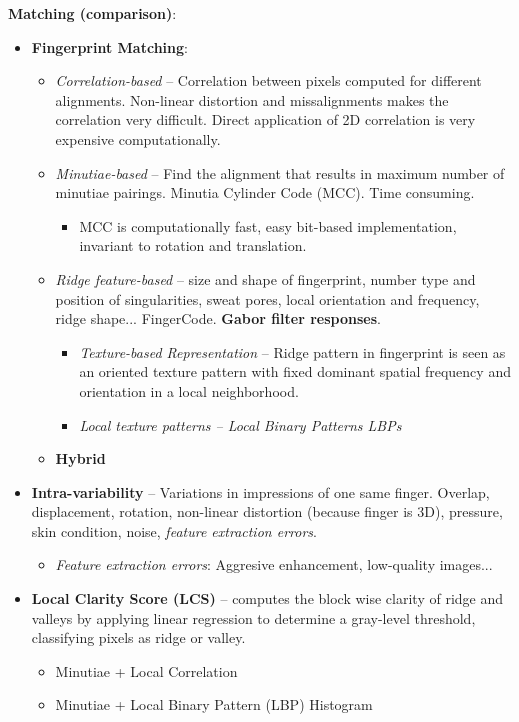 \documentclass[a4paper]{article}
\begin{document}
      \textbf{Matching (comparison)}:
      \begin{itemize}
        \item \textbf{Fingerprint Matching}:
        \begin{itemize}
          \item \emph{Correlation-based} -- Correlation between pixels computed for different alignments. Non-linear distortion and missalignments makes the correlation very difficult. Direct application of 2D correlation is very expensive computationally.
          \item \emph{Minutiae-based} -- Find the alignment that results in maximum number of minutiae pairings. Minutia Cylinder Code (MCC). Time consuming.
          \begin{itemize}
            \item MCC is computationally fast, easy bit-based implementation, invariant to rotation and translation.
          \end{itemize}
          \item \emph{Ridge feature-based} -- size and shape of fingerprint, number type and position of singularities, sweat pores, local orientation and frequency, ridge shape... FingerCode. \textbf{Gabor filter responses}.
          \begin{itemize}
            \item \emph{Texture-based Representation} -- Ridge pattern in fingerprint is seen as an oriented texture pattern with fixed dominant spatial frequency and orientation in a local neighborhood.
            \item \emph{Local texture patterns -- Local Binary Patterns LBPs}
          \end{itemize}
          \item \textbf{Hybrid}
        \end{itemize}
        \item \textbf{Intra-variability} -- Variations in impressions of one same finger. Overlap, displacement, rotation, non-linear distortion (because finger is 3D), pressure, skin condition, noise, \emph{feature extraction errors}.
        \begin{itemize}
          \item \emph{Feature extraction errors}: Aggresive enhancement, low-quality images...
        \end{itemize}
        \item \textbf{Local Clarity Score (LCS)} -- computes the block wise clarity of ridge and valleys by applying linear regression to determine a gray-level threshold, classifying pixels as ridge or valley.
        \begin{itemize}
          \item Minutiae + Local Correlation
          \item Minutiae + Local Binary Pattern (LBP) Histogram
        \end{itemize}
      \end{itemize}
\end{document}
